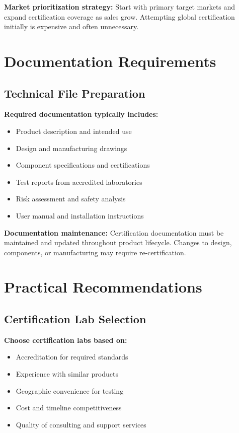 \textbf{Market prioritization strategy:}
Start with primary target markets and expand certification coverage as sales grow. Attempting global certification initially is expensive and often unnecessary.

\section{Documentation Requirements}

\subsection{Technical File Preparation}

\textbf{Required documentation typically includes:}
\begin{itemize}
\item Product description and intended use
\item Design and manufacturing drawings
\item Component specifications and certifications
\item Test reports from accredited laboratories
\item Risk assessment and safety analysis
\item User manual and installation instructions
\end{itemize}

\textbf{Documentation maintenance:}
Certification documentation must be maintained and updated throughout product lifecycle. Changes to design, components, or manufacturing may require re-certification.

\section{Practical Recommendations}

\subsection{Certification Lab Selection}

\textbf{Choose certification labs based on:}
\begin{itemize}
\item Accreditation for required standards
\item Experience with similar products
\item Geographic convenience for testing
\item Cost and timeline competitiveness
\item Quality of consulting and support services
\end{itemize}

